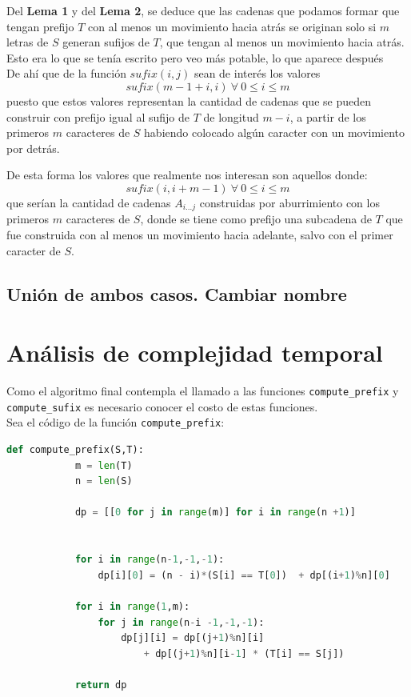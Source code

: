 \documentclass[a4paper]{article}
\begin{document}
	
	
	Del \textbf{Lema 1} y del \textbf{Lema 2}, se deduce que las cadenas que podamos formar que tengan prefijo $T$ con al menos un 
	movimiento hacia atr\'as se originan solo si $m$ letras de $S$ generan sufijos de $T$, que tengan al menos un movimiento hacia atr\'as. \\
	
	{\tiny
	Esto era lo que se tenía escrito pero veo más potable, lo que aparece después\\
	
	De ah\'i que de la funci\'on $sufix(i,j)$ sean de inter\'es los valores $$sufix(m -1 +i, i)~ \forall~0 \leq i \leq m$$ puesto que estos valores representan la cantidad
	de cadenas que se pueden construir con prefijo igual al sufijo de $T$ de longitud $m-i$, a partir de los primeros $m$ caracteres de $S$ habiendo colocado alg\'un caracter con un
	movimiento por detr\'as.\\
	
}
	
	De esta forma los valores que realmente nos interesan son aquellos donde:
	$$sufix(i, i+m-1) ~ \forall~0 \leq i \leq m$$
	que serían la cantidad de cadenas $A_{i...j}$ construidas por aburrimiento con los primeros $m$ caracteres de $S$, donde se tiene como prefijo una subcadena de $T$ que fue construida con al menos un movimiento hacia adelante, salvo con el primer caracter de $S$.
	
	\subsection*{Unión de ambos casos. Cambiar nombre}
	
	
    
    \section*{An\'alisis de complejidad temporal}

    Como el algoritmo final contempla el llamado a las funciones \texttt{compute\_prefix} y \texttt{compute\_sufix}
    es necesario conocer el costo de estas funciones.\\ 

    Sea el c\'odigo de la funci\'on \texttt{compute\_prefix}: 

    \begin{lstlisting}[language=Python]
        def compute_prefix(S,T):
            m = len(T)
            n = len(S)

            dp = [[0 for j in range(m)] for i in range(n +1)]

    
            for i in range(n-1,-1,-1):
                dp[i][0] = (n - i)*(S[i] == T[0])  + dp[(i+1)%n][0] 

            for i in range(1,m):
                for j in range(n-i -1,-1,-1):
                    dp[j][i] = dp[(j+1)%n][i] 
                        + dp[(j+1)%n][i-1] * (T[i] == S[j])

            return dp
    \end{lstlisting}
\end{document}
